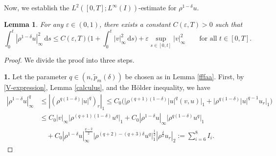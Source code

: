 \documentclass[11pt,reqno]{amsart}
\newtheorem{lem}{Lemma}[section]
\numberwithin{rk}{section}
\numberwithin{prop}{section}
\numberwithin{mydef}{section}
\numberwithin{lem}{section}
\numberwithin{equation}{section}
\numberwithin{thm}{section}
\begin{document}
Now, we establish the $L^2([0,T];L^\infty(I))$-estimate for $\rho^{1-\delta} u$.



\begin{lem}\label{cru3}
For any $\varepsilon\in (0,1)$, there exists a constant $C(\varepsilon,T)>0$ such that
\begin{equation*}
\int_0^t |\rho^{1-\delta}u|_{\infty}^2\, \mathrm{d}s\leq C(\varepsilon,T)\Big(1+ \int_0^t |v|_\infty^2\,\mathrm{d}s\Big)+\varepsilon \sup_{s\in[0,t]}|v|_\infty^2\qquad\text{for all $t\in [0,T]$}.
\end{equation*}
\end{lem}
\begin{proof}
We divide the proof into three steps.


\smallskip
\textbf{1.} Let the parameter $q\in (n,\tilde{p}_m(\delta))$ be chosen as in Lemma \ref{fffaa}. First, by \eqref{V-expression}, Lemma \ref{calculus}, and the H\"older inequality, we have
\begin{equation}\label{5122}
\begin{aligned}
|\rho^{1-\delta}u|_\infty^{q}&\leq |(\rho^{q(1-\delta)} |u|^{q})_r|_1\leq C_0\big(\big|\rho^{(q+1)(1-\delta)}|u|^{q}(v,u)\big|_1+\big|\rho^{q(1-\delta)} |u|^{q-1}u_r\big|_1\big)\\[6pt]
&\leq C_0|v|_\infty\big|\rho^{(q+1)(1-\delta)}u^{q}\big|_1+C_0|\rho^{1-\delta}u|_\infty \big|\rho^{q(1-\delta)}u^{q}\big|_1\\[-4pt]
&\quad +C_0|\rho^{1-\delta}u|_\infty^\frac{q-2}{2}\big|\rho^{(q+2)-(q+3)\delta}u^q \big|_1^\frac{1}{2}|\rho^\frac{\delta}{2}u_r|_2 :=\sum_{i=6}^{8} I_i.
\end{aligned}
\end{equation}


\end{proof}
\end{document}
